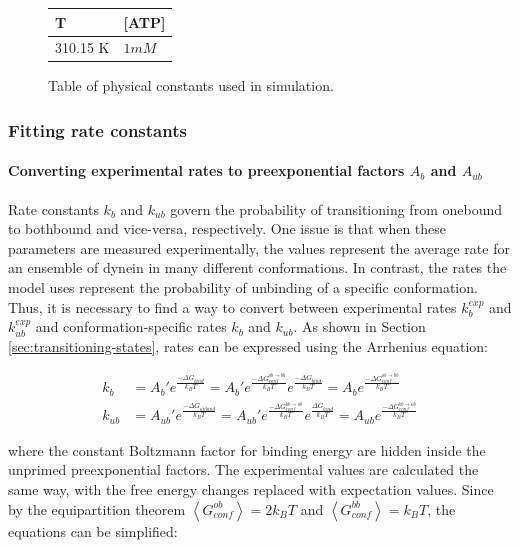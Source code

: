 \documentclass[10pt]{article} %
\begin{document}
\begin{figure}[h]
  \centering
  \begin{tabular}{| l | l |}
    \hline
    T & [ATP] \\ \hline
    310.15 K & $1mM$\\ \hline
  \end{tabular}
  \caption{Table of physical constants used in simulation.}
  \label{table:parameter-table}
\end{figure}

\subsubsection{Fitting rate constants}
\paragraph{Converting experimental rates to preexponential factors $A_b$ and $A_{ub}$}
Rate constants $k_b$ and $k_{ub}$ govern the probability of transitioning from onebound to bothbound and vice-versa, respectively. One issue is that when these parameters are measured experimentally, the values represent the average rate for an ensemble of dynein in many different conformations. In contrast, the rates the model uses represent the probability of unbinding of a specific conformation. Thus, it is necessary to find a way to convert between experimental rates $k_b^{exp}$ and $k_{ub}^{exp}$ and conformation-specific rates $k_b$ and $k_{ub}$. As shown in Section \ref{sec:transitioning-states}, rates can be expressed using the Arrhenius equation:

\begin{align*}
  k_b &= A_b'e^{\frac{-\Delta G_{bind}}{k_BT}} = A_b'e^{\frac{-\Delta G_{conf}^{ob\rightarrow bb}}{k_BT}}e^{\frac{-\Delta G_{bind}}{k_BT}} = A_be^{\frac{-\Delta G_{conf}^{ob\rightarrow bb}}{k_BT}}\\
  k_{ub} &= A_{ub}'e^{\frac{-\Delta G_{unbind}}{k_BT}} = A_{ub}'e^{\frac{-\Delta G_{conf}^{bb\rightarrow ob}}{k_BT}}e^{\frac{\Delta G_{bind}}{k_BT}} = A_{ub}e^{\frac{-\Delta G_{conf}^{bb\rightarrow ob}}{k_BT}}
\end{align*}

where the constant Boltzmann factor for binding energy are hidden inside the unprimed preexponential factors. The experimental values are calculated the same way, with the free energy changes replaced with expectation values. Since by the equipartition theorem $\left<G_{conf}^{ob}\right> = 2k_BT$ and $\left<G_{conf}^{bb}\right> = k_BT$, the equations can be simplified:
\end{document}
